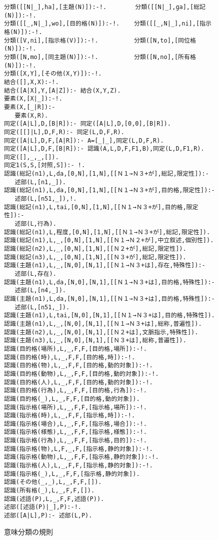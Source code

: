 \begin{figure}[htbp]
\footnotesize
\begin{verbatim}
分類([[N|_],ha],[主題(N)]):-!.        分類([[N|_],ga],[総記(N)]):-!.
分類([[_,N|_],wo],[目的格(N)]):-!.    分類([[_,N|_],ni],[指示格(N)]):-!.
分類([V,ni],[指示格(V)]):-!.          分類([N,to],[同位格(N)]):-!.
分類([N,mo],[同主題(N)]):-!.          分類([N,no],[所有格(N)]):-!.
分類([X,Y],[その他(X,Y)]):-!.
結合([],X,X):-!.
結合([A|X],Y,[A|Z]):- 結合(X,Y,Z).
要素(X,[X|_]):-!.
要素(X,[_|R]):-
   要素(X,R).
同定([A|L],D,[B|R]):- 同定([A|L],D,[0,0],[B|R]).
同定([[]|L],D,F,R):- 同定(L,D,F,R).
同定([A|L],D,F,[A|R]):- A=[_|_],同定(L,D,F,R).
同定([A|L],D,F,[B|R]):- 認識(A,L,D,F,F1,B),同定(L,D,F1,R).
同定([],_,_,[]).
同定1(S,S,[対照,S]):- !.
認識(総記(n1),L,da,[0,N],[1,N],[[Ｎ１→Ｎ３+が],総記,限定性]):-
   述部(L,[n1,_]).   
認識(総記(n1),L,da,[0,N],[1,N],[[Ｎ１→Ｎ３+が],目的格,限定性]):-
   述部(L,[n51,_]),!.
認識(総記(n1),L,tai,[0,N],[1,N],[[Ｎ１→Ｎ３+が],目的格,限定性]):-
   述部(L,行為).
認識(総記(n1),L,程度,[0,N],[1,N],[[Ｎ１→Ｎ３+が],総記,限定性]).
認識(総記(n1),L,_,[0,N],[1,N],[[Ｎ１→Ｎ２+が],中立叙述,個別性]).
認識(総記(n2),L,_,[0,N],[1,N],[[Ｎ２+が],総記,限定性]).
認識(総記(n3),L,_,[0,N],[1,N],[[Ｎ３+が],総記,限定性]).
認識(主題(n1),L,_,[N,0],[N,1],[[Ｎ１→Ｎ３+は],存在,特殊性]):-
   述部(L,存在).
認識(主題(n1),L,da,[N,0],[N,1],[[Ｎ１→Ｎ３+は],目的格,特殊性]):-
   述部(L,[n4,_]).
認識(主題(n1),L,da,[N,0],[N,1],[[Ｎ１→Ｎ３+は],目的格,特殊性]):-
   述部(L,[n51,_]).  
認識(主題(n1),L,tai,[N,0],[N,1],[[Ｎ１→Ｎ３+は],目的格,特殊性]).
認識(主題(n1),L,_,[N,0],[N,1],[[Ｎ１→Ｎ３+は],総称,普遍性]).
認識(主題(n2),L,_,[N,0],[N,1],[[Ｎ２+は],文脈指示,特殊性]).
認識(主題(n3),L,_,[N,0],[N,1],[[Ｎ３+は],総称,普遍性]).
認識(目的格(場所),L,_,F,F,[目的格,場所]):-!.
認識(目的格(時),L,_,F,F,[目的格,時]):-!.
認識(目的格(物),L,_,F,F,[目的格,動的対象]):-!.
認識(目的格(動物),L,_,F,F,[目的格,動的対象]):-!.
認識(目的格(人),L,_,F,F,[目的格,動的対象]):-!.
認識(目的格(行為),L,_,F,F,[目的格,行為]):-!.
認識(目的格(_),L,_,F,F,[目的格,動的対象]).
認識(指示格(場所),L,_,F,F,[指示格,場所]):-!.
認識(指示格(時),L,_,F,F,[指示格,時]):-!.
認識(指示格(場合),L,_,F,F,[指示格,場合]):-!.
認識(指示格(様態),L,_,F,F,[指示格,様態]):-!.
認識(指示格(行為),L,_,F,F,[指示格,目的]):-!.
認識(指示格(物),L,F,_,F,[指示格,静的対象]):-!.
認識(指示格(動物),L,_,F,F,[指示格,静的対象]):-!.
認識(指示格(人),L,_,F,F,[指示格,静的対象]):-!.
認識(指示格(_),L,_,F,F,[指示格,静的対象]).
認識(その他(_,_),L,_,F,F,[]).
認識(所有格(_),L,_,F,F,[]).
認識(述語(P),L,_,F,F,述語(P)).
述部([述語(P)|_],P):-!.
述部([A|L],P):- 述部(L,P).
\end{verbatim}

\normalsize
\caption{意味分類の規則}
\label{fig:augmentation}
\end{figure}
\normalsize

